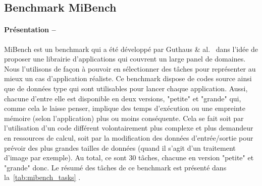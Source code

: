 \documentclass[french, a4paper, 11pt, twoside, pdftex]{StyleThese}
\begin{document}
        \subsection{Benchmark MiBench}
        \paragraph{Présentation --} MiBench est un benchmark qui a été développé par Guthaus \& al.~\cite{guthaus_mibench_2001} dans l'idée de proposer une librairie d'applications qui couvrent un large panel de domaines. Nous l'utilisons de façon à pouvoir en sélectionner des tâches pour représenter au mieux un cas d'application réaliste. 
        Ce benchmark dispose de codes source ainsi que de données type qui sont utilisables pour lancer chaque application. Aussi, chacune d'entre elle est disponible en deux versions, "petite" et "grande" qui, comme cela le laisse penser, implique des temps d'exécution ou une empreinte mémoire (selon l'application) plus ou moins conséquente. Cela se fait soit par l'utilisation d'un code différent volontairement plus complexe et plus demandeur en ressources de calcul, soit par la modification des données d'entrée/sortie pour prévoir des plus grandes tailles de données (quand il s'agit d'un traitement d'image par exemple). Au total, ce sont 30 tâches, chacune en version "petite" et "grande" donc. Le résumé des tâches de ce benchmark est présenté dans la~\autoref{tab:mibench_tasks} .
\end{document}
